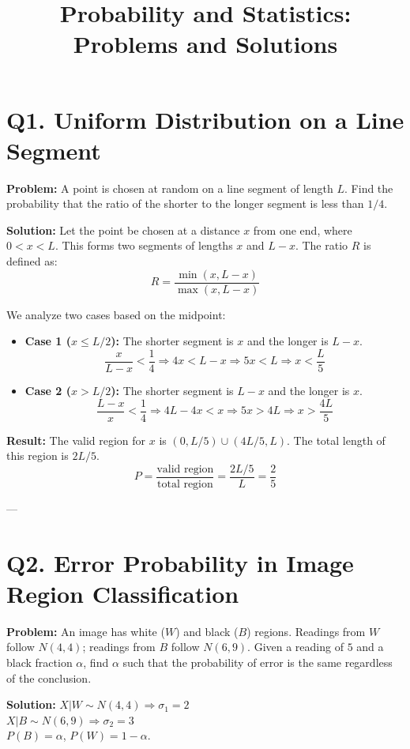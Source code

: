 \documentclass{article}
\title{Probability and Statistics: Problems and Solutions}
\author{}
\date{}
\begin{document}
\maketitle

\section*{Q1. Uniform Distribution on a Line Segment}
\textbf{Problem:} A point is chosen at random on a line segment of length $L$. Find the probability that the ratio of the shorter to the longer segment is less than $1/4$.

\textbf{Solution:} 
Let the point be chosen at a distance $x$ from one end, where $0 < x < L$. This forms two segments of lengths $x$ and $L-x$. The ratio $R$ is defined as:
\[ R = \frac{\min(x, L-x)}{\max(x, L-x)} \]

We analyze two cases based on the midpoint:
\begin{itemize}
    \item \textbf{Case 1 ($x \le L/2$):} The shorter segment is $x$ and the longer is $L-x$.
    \[ \frac{x}{L-x} < \frac{1}{4} \Rightarrow 4x < L-x \Rightarrow 5x < L \Rightarrow x < \frac{L}{5} \]
    \item \textbf{Case 2 ($x > L/2$):} The shorter segment is $L-x$ and the longer is $x$.
    \[ \frac{L-x}{x} < \frac{1}{4} \Rightarrow 4L - 4x < x \Rightarrow 5x > 4L \Rightarrow x > \frac{4L}{5} \]
\end{itemize}

\textbf{Result:} The valid region for $x$ is $(0, L/5) \cup (4L/5, L)$. The total length of this region is $2L/5$.
\[ P = \frac{\text{valid region}}{\text{total region}} = \frac{2L/5}{L} = \frac{2}{5} \]

---

\section*{Q2. Error Probability in Image Region Classification}
\textbf{Problem:} An image has white ($W$) and black ($B$) regions. Readings from $W$ follow $N(4, 4)$; readings from $B$ follow $N(6, 9)$. Given a reading of $5$ and a black fraction $\alpha$, find $\alpha$ such that the probability of error is the same regardless of the conclusion.

\textbf{Solution:}
$X|W \sim N(4, 4) \Rightarrow \sigma_1 = 2$ \\
$X|B \sim N(6, 9) \Rightarrow \sigma_2 = 3$ \\
$P(B) = \alpha$, $P(W) = 1 - \alpha$. 
\end{document}
